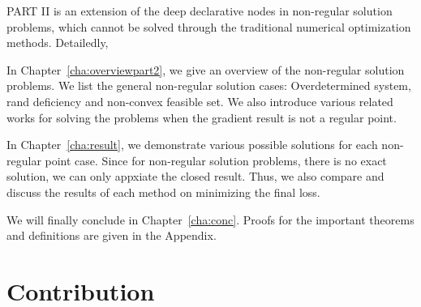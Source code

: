 \par PART II is an extension of the deep declarative nodes in non-regular solution problems, which cannot be solved through the traditional numerical optimization methods. Detailedly, 
\begin{description}
    \item In Chapter~\ref{cha:overviewpart2}, we give an overview of the non-regular solution problems. We list the general non-regular solution cases: Overdetermined system, rand deficiency and non-convex feasible set. We also introduce various related works for solving the problems when the gradient result is not a regular point. 
    \item In Chapter~\ref{cha:result}, we demonstrate various possible solutions for each non-regular point case. Since for non-regular solution problems, there is no exact solution, we can only appxiate the closed result. Thus, we also compare and discuss the results of each method on minimizing the final loss. 
\end{description}
We will finally conclude in Chapter~\ref{cha:conc}. Proofs for the important theorems and definitions are given in the Appendix.

\section{Contribution}
\label{sec.contribution}